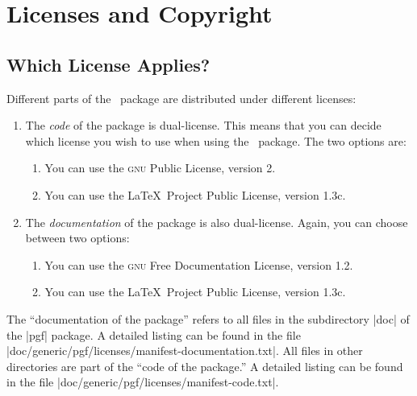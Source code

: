 %
%
%


\section{Licenses and Copyright}
\label{section-license}

\subsection{Which License Applies?}

Different parts of the \pgfname\ package are distributed under different
licenses:
%
\begin{enumerate}
    \item The \emph{code} of the package is dual-license. This means that you
        can decide which license you wish to use when using the \pgfname\
        package. The two options are:
        \begin{enumerate}
            \item You can use the \textsc{gnu} Public License, version 2.
            \item You can use the \LaTeX\ Project Public License, version
                1.3c.
        \end{enumerate}
    \item The \emph{documentation} of the package is also dual-license.
        Again, you can choose between two options:
        \begin{enumerate}
            \item You can use the \textsc{gnu} Free Documentation License,
                version 1.2.
            \item You can use the \LaTeX\ Project Public License, version
                1.3c.
        \end{enumerate}
\end{enumerate}

The ``documentation of the package'' refers to all files in the subdirectory
|doc| of the |pgf| package. A detailed listing can be found in the file
|doc/generic/pgf/licenses/manifest-documentation.txt|. All files in other
directories are part of the ``code of the package.'' A detailed listing can be
found in the file |doc/generic/pgf/licenses/manifest-code.txt|.

